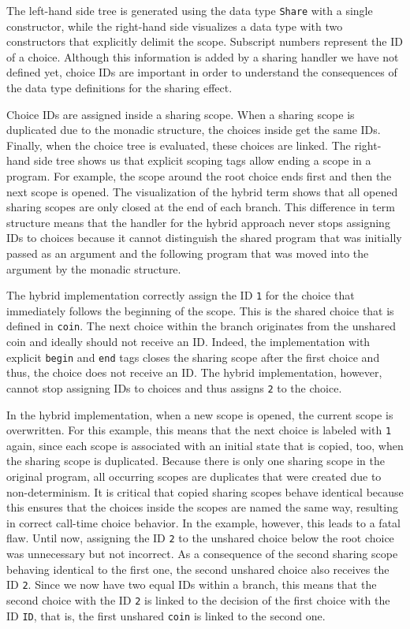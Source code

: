 \documentclass[a4paper, 11pt, fleqn, twoside]{scrreprt}
\newcommand{\hinl}[1]{\texttt{#1}}
\begin{document}
\vspace{0.32cm}

The left-hand side tree is generated using the data type \hinl{Share} with a single constructor, while the right-hand side visualizes a data type with two constructors that explicitly delimit the scope.
Subscript numbers represent the ID of a choice.
Although this information is added by a sharing handler we have not defined yet, choice IDs are important in order to understand the consequences of the data type definitions for the sharing effect.

Choice IDs are assigned inside a sharing scope.
When a sharing scope is duplicated due to the monadic structure, the choices inside get the same IDs.
Finally, when the choice tree is evaluated, these choices are linked.
The right-hand side tree shows us that explicit scoping tags allow ending a scope in a program.
For example, the scope around the root choice ends first and then the next scope is opened.
The visualization of the hybrid term shows that all opened sharing scopes are only closed at the end of each branch.
This difference in term structure means that the handler for the hybrid approach never stops assigning IDs to choices because it cannot distinguish the shared program that was initially passed as an argument and the following program that was moved into the argument by the monadic structure.

The hybrid implementation correctly assign the ID \hinl{1} for the choice that immediately follows the beginning of the scope.
This is the shared choice that is defined in \hinl{coin}.
The next choice within the branch originates from the unshared coin and ideally should not receive an ID.
Indeed, the implementation with explicit \hinl{begin} and \hinl{end} tags closes the sharing scope after the first choice and thus, the choice does not receive an ID.
The hybrid implementation, however, cannot stop assigning IDs to choices and thus assigns \hinl{2} to the choice.

In the hybrid implementation, when a new scope is opened, the current scope is overwritten.
For this example, this means that the next choice is labeled with \hinl{1} again, since each scope is associated with an initial state that is copied, too, when the sharing scope is duplicated.
Because there is only one sharing scope in the original program, all occurring scopes are duplicates that were created due to non-determinism.
It is critical that copied sharing scopes behave identical because this ensures that the choices inside the scopes are named the same way, resulting in correct call-time choice behavior.
In the example, however, this leads to a fatal flaw.
Until now, assigning the ID \hinl{2} to the unshared choice below the root choice was unnecessary but not incorrect.
As a consequence of the second sharing scope behaving identical to the first one, the second unshared choice also receives the ID \hinl{2}.
Since we now have two equal IDs within a branch, this means that the second choice with the ID \hinl{2} is linked to the decision of the first choice with the ID \hinl{ID}, that is, the first unshared \hinl{coin} is linked to the second one.
\end{document}
